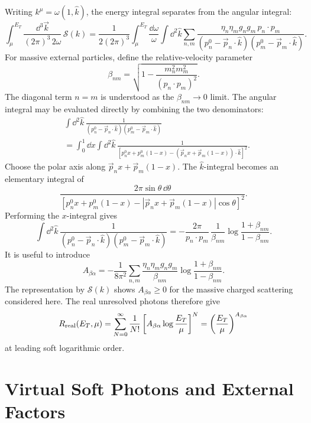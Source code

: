 Writing \(k^\mu=\omega(1,\hat k)\), the energy integral separates from the
angular integral:
\[
  \int_{\mu}^{E_T}
  \frac{\dd^3\vec k}{(2\pi)^3\,2\omega}\,\mathcal S(k)
  =
  \frac{1}{2(2\pi)^3}
  \int_{\mu}^{E_T}\frac{\dd\omega}{\omega}
  \int\dd^2\hat k
  \sum_{n,m}
  \frac{\eta_n\eta_m g_ng_m\,p_n\cdot p_m}
       {(p_n^0-\vec p_n\cdot\hat k)
        (p_m^0-\vec p_m\cdot\hat k)} .
\]
For massive external particles, define the relative-velocity parameter
\[
  \beta_{nm}
  =
  \sqrt{1-\frac{m_n^2m_m^2}{(p_n\cdot p_m)^2}} .
\]
The diagonal term \(n=m\) is understood as the \(\beta_{nm}\to0\) limit.  The
angular integral may be evaluated directly by combining the two denominators:
\[
\begin{aligned}
  &\int\dd^2\hat k\,
  \frac{1}
       {(p_n^0-\vec p_n\cdot\hat k)
        (p_m^0-\vec p_m\cdot\hat k)}
\\
  &=
  \int_0^1\dd x
  \int\dd^2\hat k\,
  \frac{1}
  {\left[
    p_n^0x+p_m^0(1-x)
    -(\vec p_nx+\vec p_m(1-x))\cdot\hat k
  \right]^2}.
\end{aligned}
\]
Choose the polar axis along
\(\vec p_nx+\vec p_m(1-x)\).  The \(\hat k\)-integral becomes an elementary
integral of
\[
  \frac{2\pi\sin\theta\,\dd\theta}
  {\left[
    p_n^0x+p_m^0(1-x)
    -|\vec p_nx+\vec p_m(1-x)|\cos\theta
  \right]^2}.
\]
Performing the \(x\)-integral gives
\[
  \int\dd^2\hat k\,
  \frac{1}
       {(p_n^0-\vec p_n\cdot\hat k)
        (p_m^0-\vec p_m\cdot\hat k)}
  =
  -\frac{2\pi}{p_n\cdot p_m}\,
  \frac{1}{\beta_{nm}}
  \log\frac{1+\beta_{nm}}{1-\beta_{nm}} .
\]
It is useful to introduce
\[
  A_{\beta\alpha}
  =
  -\frac{1}{8\pi^2}
  \sum_{n,m}
  \frac{\eta_n\eta_m g_ng_m}{\beta_{nm}}
  \log\frac{1+\beta_{nm}}{1-\beta_{nm}} .
\]
The representation by \(\mathcal S(k)\) shows \(A_{\beta\alpha}\ge0\) for the
massive charged scattering considered here.  The real unresolved photons
therefore give
\[
  R_{\rm real}(E_T,\mu)
  =
  \sum_{N=0}^{\infty}
  \frac1{N!}
  \left[
    A_{\beta\alpha}\log\frac{E_T}{\mu}
  \right]^N
  =
  \left(\frac{E_T}{\mu}\right)^{A_{\beta\alpha}}
\]
at leading soft logarithmic order.

\section{Virtual Soft Photons and External Factors}

